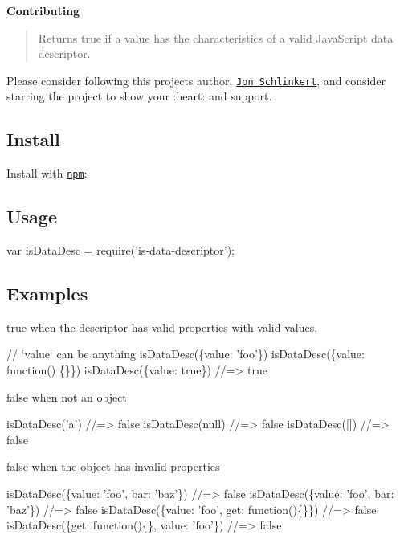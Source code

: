 {\bfseries Contributing}

\begin{quote}
Returns true if a value has the characteristics of a valid Java\+Script data descriptor. \end{quote}


Please consider following this project\textquotesingle{}s author, \href{https://github.com/jonschlinkert}{\tt Jon Schlinkert}, and consider starring the project to show your \+:heart\+: and support.

\subsection*{Install}

Install with \href{https://www.npmjs.com/}{\tt npm}\+:




\subsection*{Usage}


\begin{DoxyCode}
var isDataDesc = require('is-data-descriptor');
\end{DoxyCode}


\subsection*{Examples}

{\ttfamily true} when the descriptor has valid properties with valid values.


\begin{DoxyCode}
// `value` can be anything
isDataDesc(\{value: 'foo'\})
isDataDesc(\{value: function() \{\}\})
isDataDesc(\{value: true\})
//=> true
\end{DoxyCode}


{\ttfamily false} when not an object


\begin{DoxyCode}
isDataDesc('a')
//=> false
isDataDesc(null)
//=> false
isDataDesc([])
//=> false
\end{DoxyCode}


{\ttfamily false} when the object has invalid properties


\begin{DoxyCode}
isDataDesc(\{value: 'foo', bar: 'baz'\})
//=> false
isDataDesc(\{value: 'foo', bar: 'baz'\})
//=> false
isDataDesc(\{value: 'foo', get: function()\{\}\})
//=> false
isDataDesc(\{get: function()\{\}, value: 'foo'\})
//=> false
\end{DoxyCode}


